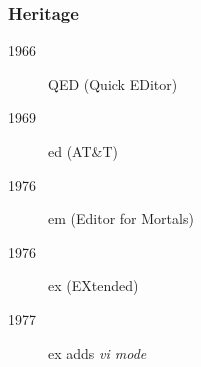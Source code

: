 \begin{frame}[fragile]
  \frametitle{Heritage}
  \begin{description}
    \item[1966] QED (Quick EDitor)
    \item[1969] ed (AT\&T)
    \item[1976] em (Editor for Mortals)
    \item[1976] ex (EXtended)
    \item[1977] ex adds \textit{vi mode}
  \end{description}
\end{frame}

